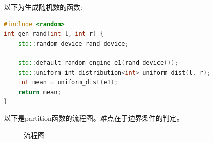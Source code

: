 \documentclass[supercite]{Experimental_Report}
\theoremstyle{definition}
\begin{document}
\noindent
以下为生成随机数的函数:
\begin{lstlisting}[language=C++, frame=single]
#include <random>
int gen_rand(int l, int r) {
	std::random_device rand_device;

	std::default_random_engine e1(rand_device());
	std::uniform_int_distribution<int> uniform_dist(l, r);
	int mean = uniform_dist(e1);
	return mean;
}
\end{lstlisting}

\clearpage
\noindent
以下是partition函数的流程图。难点在于边界条件的判定。
\begin{figure}[H]
	\centering
	\centering
	\caption{流程图}
	\label{fig6-1}
\end{figure}
\end{document}

